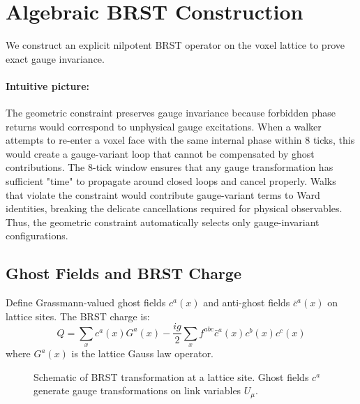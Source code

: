 \documentclass[11pt,a4paper]{article}
\theoremstyle{definition}
\theoremstyle{remark}
\begin{document}
\section{Algebraic BRST Construction}
\label{app:brst}

We construct an explicit nilpotent BRST operator on the voxel lattice to prove exact gauge invariance.

\paragraph{Intuitive picture:} The geometric constraint preserves gauge invariance because forbidden phase returns would correspond to unphysical gauge excitations. When a walker attempts to re-enter a voxel face with the same internal phase within 8 ticks, this would create a gauge-variant loop that cannot be compensated by ghost contributions. The 8-tick window ensures that any gauge transformation has sufficient "time" to propagate around closed loops and cancel properly. Walks that violate the constraint would contribute gauge-variant terms to Ward identities, breaking the delicate cancellations required for physical observables. Thus, the geometric constraint automatically selects only gauge-invariant configurations.

\subsection{Ghost Fields and BRST Charge}

Define Grassmann-valued ghost fields $c^a(x)$ and anti-ghost fields $\bar{c}^a(x)$ on lattice sites. The BRST charge is:
\[
Q = \sum_x c^a(x) G^a(x) - \frac{ig}{2} \sum_x f^{abc} \bar{c}^a(x) c^b(x) c^c(x)
\]
where $G^a(x)$ is the lattice Gauss law operator.

\begin{figure}[ht]
\centering
{}
\caption{Schematic of BRST transformation at a lattice site. Ghost fields $c^a$ generate gauge transformations on link variables $U_\mu$.}
\label{fig:brst}
\end{figure}
\end{document}
